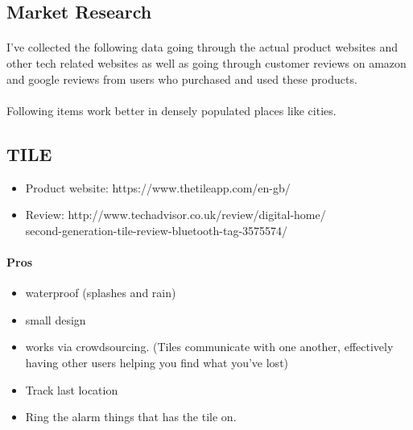 \documentclass[12pt,a4paper]{article}
\begin{document}
\begin{appendices}
      \section{Market Research}
        \paragraph{}
        I’ve collected the following data going through the actual product websites and other tech related websites as well as going through customer reviews on amazon and google reviews from users who purchased and used these products.
        \paragraph{}
        Following items work better in densely populated places like cities.
        \subsection{TILE}
          \begin{itemize}
            \item Product website: https://www.thetileapp.com/en-gb/
            \item Review: http://www.techadvisor.co.uk/review/digital-home/\\second-generation-tile-review-bluetooth-tag-3575574/
          \end{itemize}
          \paragraph{Pros}
            \begin{itemize}
              \item waterproof (splashes and rain)
              \item small design
              \item works via crowdsourcing. (Tiles communicate with one another, effectively having other users helping you find what you've lost)
              \item Track last location
              \item Ring the alarm things that has the tile on.
            \end{itemize} 

\end{appendices}
\end{document}
